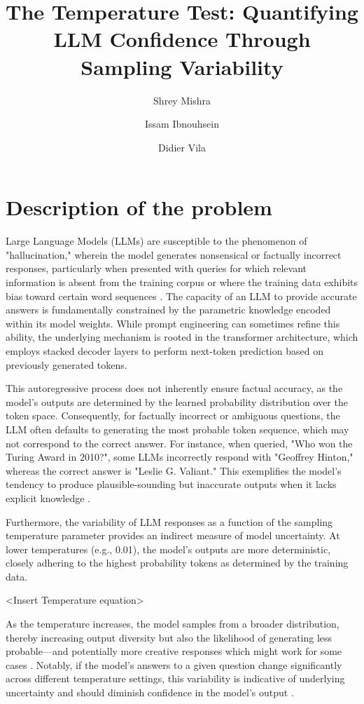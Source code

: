 \documentclass[sigconf]{acmart}
\title{The Temperature Test: Quantifying LLM Confidence Through Sampling Variability}
\author{Shrey Mishra}
\affiliation{%
  \institution{Alpha10x}
  \city{Aix en Provence}
  \country{France}
}
\author{Issam Ibnouhsein}
\affiliation{%
  \institution{Alpha10x}
  \city{Aix en Provence}
  \country{France}
}
\author{Didier Vila}
\affiliation{%
  \institution{Alpha10x}
  \city{Aix en Provence}
  \country{France}
}
\begin{document}
\maketitle

\section{Description of the problem}

Large Language Models (LLMs) are susceptible to the phenomenon of "hallucination," wherein the model generates nonsensical or factually incorrect responses, particularly when presented with queries for which relevant information is absent from the training corpus or where the training data exhibits bias toward certain word sequences \cite{hallucination_improvements}. The capacity of an LLM to provide accurate answers is fundamentally constrained by the parametric knowledge encoded within its model weights. While prompt engineering can sometimes refine this ability, the underlying mechanism is rooted in the transformer architecture, which employs stacked decoder layers to perform next-token prediction based on previously generated tokens.

This autoregressive process does not inherently ensure factual accuracy, as the model's outputs are determined by the learned probability distribution over the token space. Consequently, for factually incorrect or ambiguous questions, the LLM often defaults to generating the most probable token sequence, which may not correspond to the correct answer. For instance, when queried, "Who won the Turing Award in 2010?", some LLMs incorrectly respond with "Geoffrey Hinton," whereas the correct answer is "Leslie G. Valiant." This exemplifies the model's tendency to produce plausible-sounding but inaccurate outputs when it lacks explicit knowledge \cite{survey_hallucination}.

Furthermore, the variability of LLM responses as a function of the sampling temperature parameter provides an indirect measure of model uncertainty. At lower temperatures (e.g., 0.01), the model's outputs are more deterministic, closely adhering to the highest probability tokens as determined by the training data. 

<Insert Temperature equation>

As the temperature increases, the model samples from a broader distribution, thereby increasing output diversity but also the likelihood of generating less probable—and potentially more creative responses which might work for some cases \cite{hallucinations_drug,temperature_effect}. Notably, if the model's answers to a given question change significantly across different temperature settings, this variability is indicative of underlying uncertainty and should diminish confidence in the model's output \cite{detecting_hallucinations}.
\end{document}
